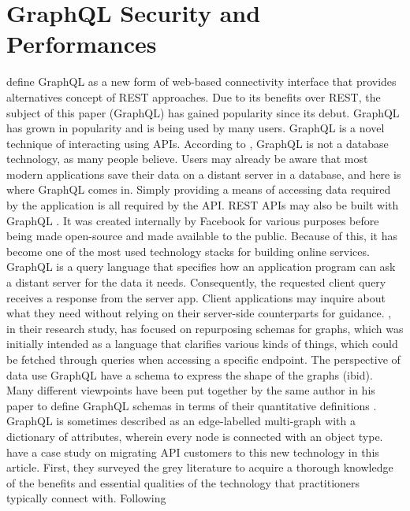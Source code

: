 \section{GraphQL Security and Performances}
\label{s:GraphQLSecurity}
\citet{hartigInitialAnalysisFacebook2017} define GraphQL as a new form of
web-based connectivity interface that provides alternatives concept of REST
approaches. Due to its benefits over REST, the subject of this paper (GraphQL)
has gained popularity since its debut. GraphQL has grown in popularity and is
being used by many users. GraphQL is a novel technique of interacting using APIs.
According to \citet{vogelExperiencesMigratingRESTful2018}, GraphQL is not a
database technology, as many people believe. Users may already be aware that
most modern applications save their data on a distant server in a database, and
here is where GraphQL comes in. Simply providing a means of accessing data
required by the application is all required by the API. REST APIs may also be
built with GraphQL \citep{vadlamaniCanGraphQLReplace2021}. It was created
internally by Facebook for various purposes before being made open-source and
made available to the public. Because of this, it has become one of the most
used technology stacks for building online services. GraphQL is a query language
that specifies how an application program can ask a distant server for the data
it needs. Consequently, the requested client query receives a response from the
server app. Client applications may inquire about what they need without relying
on their server-side counterparts for guidance. \citet{
hartigDefiningSchemasProperty2019}, in their research study, has focused on
repurposing schemas for graphs, which was initially intended as a language that
clarifies various kinds of things, which could be fetched through queries when
accessing a specific endpoint. The perspective of data use GraphQL have a schema
to express the shape of the graphs (ibid). Many different viewpoints have been
put together by the same author in his paper to define GraphQL schemas in terms
of their quantitative definitions \citep{hartigInitialAnalysisFacebook2017}.
GraphQL is sometimes described as an edge-labelled multi-graph with a dictionary
of attributes, wherein every node is connected with an object type.
\citet{britoMigratingGraphQLPractical2019} have a case study on migrating API
customers to this new technology in this article. First, they surveyed the grey
literature to acquire a thorough knowledge of the benefits and essential
qualities of the technology that practitioners typically connect with. Following
